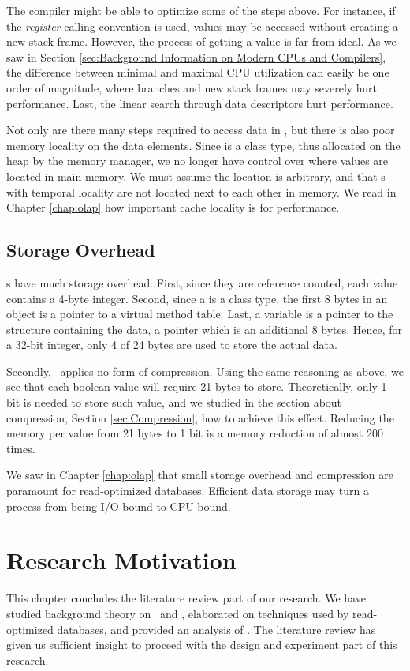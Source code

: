 The compiler might be able to optimize some of the steps above. For instance, if the \textit{register} calling convention is used, values may be accessed without creating a new stack frame. However, the process of getting a value is far from ideal. As we saw in Section \ref{sec:Background Information on Modern CPUs and Compilers}, the difference between minimal and maximal CPU utilization can easily be one order of magnitude, where branches and new stack frames may severely hurt performance. Last, the linear search through data descriptors hurt performance.

Not only are there many steps required to access data in \gap, but there is also poor memory locality on the data elements. Since  is a class type, thus allocated on the heap by the memory manager, we no longer have control over where values are located in main memory. We must assume the location is arbitrary, and that s with temporal locality are not located next to each other in memory. We read in Chapter \ref{chap:olap} how important cache locality is for performance.

\subsection{Storage Overhead}
\label{sub:Storage Overhead}
s have much storage overhead. First, since they are reference counted, each value contains a 4-byte integer. Second, since a  is a class type, the first 8 bytes in an object is a pointer to a virtual method table. Last, a  variable is a pointer to the structure containing the data, a pointer which is an additional 8 bytes. Hence, for a 32-bit integer, only 4 of 24 bytes are used to store the actual data. 

Secondly, \gap~applies no form of compression. Using the same reasoning as above, we see that each boolean value will require 21 bytes to store. Theoretically, only 1 bit is needed to store such value, and we studied in the section about compression, Section \ref{sec:Compression}, how to achieve this effect. Reducing the memory per value from 21 bytes to 1 bit is a memory reduction of almost 200 times.

We saw in Chapter \ref{chap:olap} that small storage overhead and compression are paramount for read-optimized databases. Efficient data storage may turn a process from being I/O bound to CPU bound.

\section{Research Motivation}
\label{sec:Research Motivation}
This chapter concludes the literature review part of our research. We have studied background theory on \mde~and \bi, elaborated on techniques used by read-optimized databases, and provided an analysis of \gap. The literature review has given us sufficient insight to proceed with the design and experiment part of this research. 

